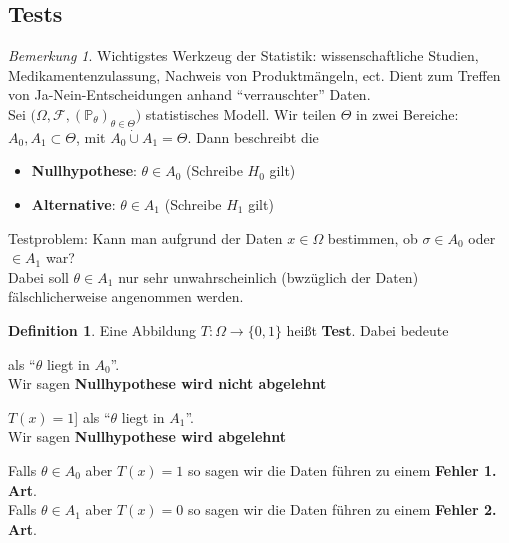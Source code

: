 \documentclass[10pt,a4paper]{article}
\newcommand{\Prb}{\mathbb P}
\newcommand{\scF}{\ensuremath{\mathscr{F}}}
\newcommand{\SM}{\big(\Omega,\scF,(\Prb_\theta)_{\theta\in\Theta}\big)}
\theoremstyle{plain}
\theoremstyle{definition}
\newtheorem{definition}[theorem]{Definition}
\theoremstyle{remark}
\newtheorem{bem}[theorem]{Bemerkung}
\begin{document}
	\subsection{Tests}
	\begin{bem}
		Wichtigstes Werkzeug der Statistik: wissenschaftliche Studien, Medikamentenzulassung, Nachweis von Produktmängeln, ect. Dient zum Treffen von Ja-Nein-Entscheidungen anhand \enquote{verrauschter} Daten.
		\\
		Sei $\SM$ statistisches Modell. Wir teilen $\Theta$ in zwei Bereiche: $A_0,A_1\subset\Theta$, mit $A_0\dot{\cup}A_1=\Theta$.
		Dann beschreibt die
		\begin{itemize}
			\item \textbf{Nullhypothese}: $\theta\in A_0$ (Schreibe $H_0$ gilt)
			\item \textbf{Alternative}: $\theta\in A_1$ (Schreibe $H_1$ gilt)
		\end{itemize}
		Testproblem: Kann man aufgrund der Daten $x\in\Omega$ bestimmen, ob $\sigma\in A_0$ oder $\in A_1$ war?\\
		Dabei soll $\theta\in A_1$ nur sehr unwahrscheinlich (bwzüglich der Daten) fälschlicherweise angenommen werden.
		
	\end{bem}
	\begin{definition}
		Eine Abbildung $T:\Omega\to\{0,1\}$ heißt \textbf{Test}. Dabei bedeute
		\begin{description}
			\item[$T(x)=0$] als \enquote{$\theta$ liegt in $A_0$}.\\
			Wir sagen \textbf{Nullhypothese wird nicht abgelehnt}
			\item$T(x)=1$] als \enquote{$\theta$ liegt in $A_1$}.\\
			Wir sagen \textbf{Nullhypothese wird abgelehnt}
		\end{description}
		Falls $\theta\in A_0$  aber $T(x)=1$ so sagen wir die Daten führen zu einem \textbf{Fehler 1. Art}.\\
		Falls $\theta\in A_1$  aber $T(x)=0$ so sagen wir die Daten führen zu einem \textbf{Fehler 2. Art}.
	\end{definition}
\end{document}

